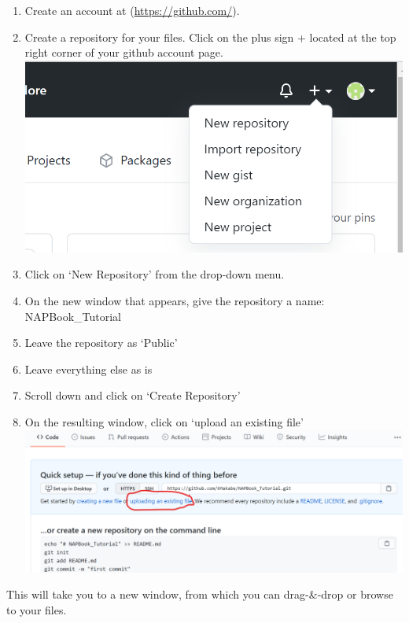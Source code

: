 \documentclass[
]{book}
\providecommand{\tightlist}{%
  \setlength{\itemsep}{0pt}\setlength{\parskip}{0pt}}
\begin{document}
\begin{enumerate}
\def\labelenumi{\arabic{enumi}.}
\tightlist
\item
  Create an account at (\url{https://github.com/}).
\item
  Create a repository for your files. Click on the plus sign + located at the top right corner of your github account page.
  \includegraphics{tutorial_screenshots/gh_create_repo.png}
\item
  Click on `New Repository' from the drop-down menu.\\
\item
  On the new window that appears, give the repository a name: NAPBook\_Tutorial\\
\item
  Leave the repository as `Public'
\item
  Leave everything else as is\\
\item
  Scroll down and click on `Create Repository'\\
\item
  On the resulting window, click on `upload an existing file'\\
  \includegraphics{tutorial_screenshots/gh_uploadfiles.png}
\end{enumerate}

This will take you to a new window, from which you can drag-\&-drop or browse to your files.
\end{document}

